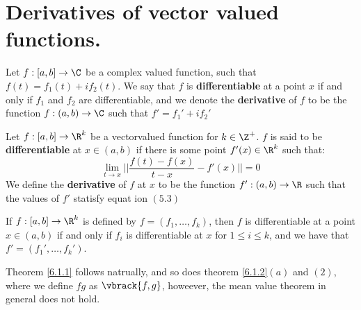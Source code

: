 
\section{Derivatives of vector valued functions.}

\begin{definition}
    Let $f:[a,b] \rightarrow \C$ be a complex valued function, such that $f(t)=f_1(t)+if_2(t)$. 
    We say that $f$ is \textbf{differentiable} at  a point $x$ if and only if  $f_1$ and $f_2$ 
    are differentiable, and we denote the \textbf{derivative} of $f$ to be the function 
    $f:(a,b) \rightarrow \C$ such that  $f'=f_1'+if_2'$
\end{definition}

\begin{definition}
    Let $f:[a,b] \rightarrow \R^k$ be a vectorvalued function for  $k \in \Z^+$.  $f$ is said 
    to be \textbf{differentiable} at $x \in (a,b)$ if there is some point $f'(x) \in \R^k$ such that:
        \begin{equation}
            \lim_{t \rightarrow x}{||\frac{f(t)-f(x)}{t-x}-f'(x)||}=0		
        \end{equation}
        We define the \textbf{derivative} of  $f$ at $x$ to be the function $f':(a,b) \rightarrow \R$ such 
        that the values of $f'$ statisfy equat ion $(5.3)$
\end{definition}

\begin{remark}
    If $f:[a,b] \rightarrow \R^k$ is defined by  $f=(f_1, \dots, f_k)$, then  $f$ is 
    differentiable at a point  $x \in (a,b)$ if and only if $f_i$ is differentiable at  $x$ 
    for  $1 \leq i \leq k$, and we have that  $f'=(f_1', \dots, f_k')$.
\end{remark}

Theorem \ref{6.1.1} follows natrually, and so does theorem \ref{6.1.2}$(a)$ and $(2)$, where 
we define  $fg$ as  $\vbrack{f,g}$, howeever, the mean value theorem in general does not hold.


